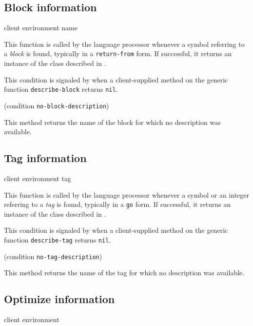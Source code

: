 \subsection{Block information}

{\footnotesize
{} {client environment name}
}

This function is called by the language processor whenever a symbol
referring to a \emph{block} is found, typically in a
\texttt{return-from} form.  If successful, it returns an instance of
the class described in
.

{\footnotesize
{}
}

This condition is signaled by \sysname{} when a client-supplied method
on the generic function \texttt{describe-block} returns \texttt{nil}.

{\footnotesize
{} {(condition {\tt no-block-description})}
}

This method returns the name of the block for which no description was
available.

\subsection{Tag information}

{\footnotesize
{} {client environment tag}
}

This function is called by the language processor whenever a symbol or
an integer referring to a \emph{tag} is found, typically in a
\texttt{go} form.  If successful, it returns an instance of the
class described in .

{\footnotesize
{}
}

This condition is signaled by \sysname{} when a client-supplied method
on the generic function \texttt{describe-tag} returns \texttt{nil}.

{\footnotesize
{} {(condition {\tt no-tag-description})}
}

This method returns the name of the tag for which no description was
available.

\subsection{Optimize information}

{\footnotesize
{} {client environment}
}

